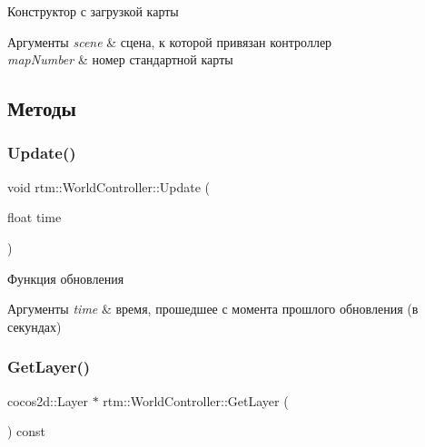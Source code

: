 Конструктор с загрузкой карты 


\begin{DoxyParams}{Аргументы}
{\em scene} & сцена, к которой привязан контроллер \\
\hline
{\em map\+Number} & номер стандартной карты \\
\hline
\end{DoxyParams}


\subsection{Методы}
\mbox{\label{classrtm_1_1_world_controller_a6b97a9ccc241734be2d68198de15068f}} 
\subsubsection{\texorpdfstring{Update()}{Update()}}
{\footnotesize\ttfamily void rtm\+::\+World\+Controller\+::\+Update (\begin{DoxyParamCaption}\item[{float}]{time }\end{DoxyParamCaption})}



Функция обновления 


\begin{DoxyParams}{Аргументы}
{\em time} & время, прошедшее с момента прошлого обновления (в секундах) \\
\hline
\end{DoxyParams}
\mbox{\label{classrtm_1_1_world_controller_a74bfc6a22a7091dc2668b08cd79f8aca}} 
\subsubsection{\texorpdfstring{Get\+Layer()}{GetLayer()}}
{\footnotesize\ttfamily cocos2d\+::\+Layer $\ast$ rtm\+::\+World\+Controller\+::\+Get\+Layer (\begin{DoxyParamCaption}{ }\end{DoxyParamCaption}) const}



